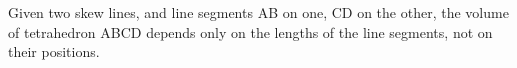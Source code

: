  Given two skew lines, and line segments AB on one, CD on the other,
the volume of tetrahedron ABCD depends only on the lengths
of the line segments, not on their positions.
